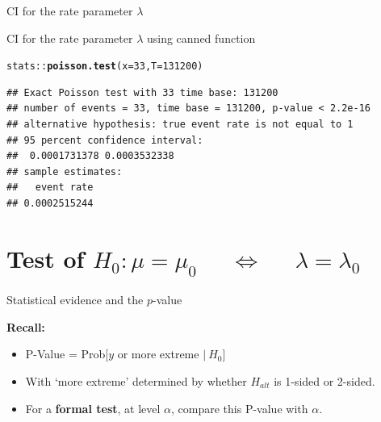 \documentclass[10pt]{beamer}\usepackage[]{graphicx}\usepackage[]{color}
\makeatletter
\newcommand{\hlnum}[1]{\textcolor[rgb]{0.686,0.059,0.569}{#1}}%
\newcommand{\hlopt}[1]{\textcolor[rgb]{0,0,0}{#1}}%
\newcommand{\hlstd}[1]{\textcolor[rgb]{0.345,0.345,0.345}{#1}}%
\newcommand{\hlkwc}[1]{\textcolor[rgb]{0.333,0.667,0.333}{#1}}%
\newcommand{\hlkwd}[1]{\textcolor[rgb]{0.737,0.353,0.396}{\textbf{#1}}}%
\newenvironment{kframe}{%
 \def\at@end@of@kframe{}%
 \ifinner\ifhmode%
  \def\at@end@of@kframe{\end{minipage}}%
  \begin{minipage}{\columnwidth}%
 \fi\fi%
 \def\FrameCommand##1{\hskip\@totalleftmargin \hskip-\fboxsep
 \colorbox{shadecolor}{##1}\hskip-\fboxsep
     \hskip-\linewidth \hskip-\@totalleftmargin \hskip\columnwidth}%
 \MakeFramed {\advance\hsize-\width
   \@totalleftmargin\z@ \linewidth\hsize
   \@setminipage}}%
 {\par\unskip\endMakeFramed%
 \at@end@of@kframe}
\newenvironment{knitrout}{}{} %
\makeatother
\begin{document}
\begin{frame}[fragile]{CI for the rate  parameter $\lambda$}
\begin{itemize}
		
	\end{itemize}
	
\end{frame}


\begin{frame}[fragile]{CI for the rate  parameter $\lambda$ using canned function}
	
\begin{knitrout}\tiny
{}\color{fgcolor}\begin{kframe}
\begin{alltt}
\hlstd{stats}\hlopt{::}\hlkwd{poisson.test}\hlstd{(}\hlkwc{x} \hlstd{=} \hlnum{33}\hlstd{,} \hlkwc{T} \hlstd{=} \hlnum{131200}\hlstd{)}
\end{alltt}
\begin{verbatim}
## Exact Poisson test with 33 time base: 131200 
## number of events = 33, time base = 131200, p-value < 2.2e-16
## alternative hypothesis: true event rate is not equal to 1 
## 95 percent confidence interval:
##  0.0001731378 0.0003532338 
## sample estimates:
##   event rate 
## 0.0002515244
\end{verbatim}
\end{kframe}
\end{knitrout}
	
\end{frame}



\section{Test of $H_{0}: \mu = \mu_{0}$ $\quad \Leftrightarrow \quad$ $\lambda = \lambda_{0}$}


\begin{frame}{Statistical evidence and the $p$-value}
	
	\textbf{Recall:}
	
	\vspace*{1cm}
	
	\begin{itemize}
		\setlength\itemsep{1.2em}
		\item P-Value = Prob[$y$ or more extreme $ |\:H_{0}$]
		
		\item With `more extreme' determined by whether $H_{alt}$ is  1-sided or 2-sided. 
		
		\item For a \textbf{formal test}, at level $\alpha$, compare this P-value with $\alpha$.
	\end{itemize}
	
\end{frame}
\end{document}
